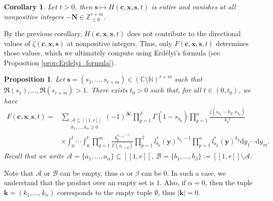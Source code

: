 \documentclass[a4paper]{amsart}
\newtheorem{proposition}[theorem]{Proposition}
\newtheorem{corollary}[theorem]{Corollary}
\theoremstyle{remark}
\theoremstyle{definition}
\newcommand{\dd}{\mathrm{d}}
\begin{document}
\begin{corollary}
\label{cor:H_entire}
Let $t>0$, then $\mathbf{s} \mapsto H(\mathbf{c},\mathbf{x},\mathbf{s},t)$ is entire and vanishes at all nonpositive integers $-\mathbf{N} \in \mathbb{Z}_{\leq 0}^{r+m}$.
\end{corollary}

By the previous corollary, $H(\mathbf{c},\mathbf{x},\mathbf{s},t)$ does not contribute to the directional values of $\zeta(\mathbf{c},\mathbf{x},\mathbf{s})$ at nonpositive integers. Thus, only $F(\mathbf{c},\mathbf{x},\mathbf{s},t)$ determines those values, which we ultimately compute using Erdélyi's formula (see Proposition \ref{prop:Erdelyi_formula}).

\begin{proposition}
\label{prop:analytic_continuation_F}
Let $\mathbf{s}=(s_1,\ldots,s_{r+m}) \in (\mathbb{C} \setminus \mathbb{N})^{r+m}$ such that $\Re(s_1),\ldots,\Re(s_{r+m})>1$. There exists $t_0>0$ such that, for all $t \in (0,t_0)$, we have
\begin{align}
    F(\mathbf{c},\mathbf{x},\mathbf{s},t) =& \sum_{\substack{\mathcal{A} \subseteq [\![1,r]\!] \\ k_1,\ldots,k_{\alpha}\geq 0}} (-1)^{|\mathbf{k}|} \prod_{p=1}^{\beta} \Gamma(1-s_{b_p}) \prod_{p=1}^{\alpha} \frac{\zeta(s_{a_p}-k_p,x_{a_p})}{k_p!} \label{eq:analytic_continuation_F} \\
    & \times \int_0^t \cdots \int_0^t \prod_{q=1}^{m} \frac{y_q^{s_{r+q}-1}}{\Gamma(s_{r+q})}\prod_{p=1}^{\beta} l^*_{b_p}(\mathbf{y})^{s_{b_p}-1} \prod_{p=1}^{\alpha} l^*_{a_p}(\mathbf{y})^{k_p} \dd y_1 \cdots \dd y_{m}. \nonumber
\end{align}
Recall that we write $\mathcal{A}=\{ a_1,\ldots,a_{\alpha} \} \subseteq [\![ 1,r ]\!]$, $\mathcal{B}=\{ b_1,\ldots,b_{\beta} \} := [\![ 1,r ]\!] \setminus \mathcal{A}$.
\end{proposition}

Note that $\mathcal{A}$ or $\mathcal{B}$ can be empty, thus $\alpha$ or $\beta$ can be $0$. In such a case, we understand that the product over an empty set is $1$. Also, if $\alpha=0$, then the tuple $\mathbf{k}=(k_1,\ldots,k_{\alpha})$ corresponds to the empty tuple $\emptyset$, thus $|\mathbf{k}|=0$.
\end{document}
